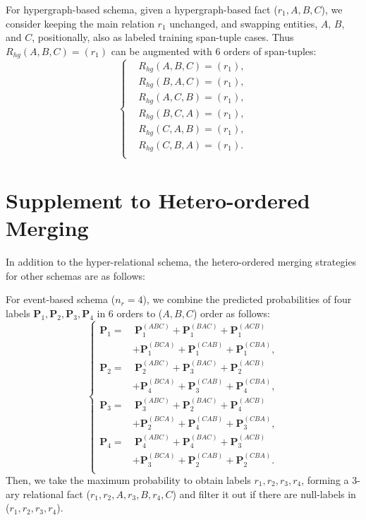 \documentclass{article} \usepackage{iclr2024_conference,times}
\begin{document}
For hypergraph-based schema, given a hypergraph-based fact ($r_1,A,B,C$), we consider keeping the main relation $r_1$ unchanged, and swapping entities, $A$, $B$, and $C$, positionally, also as labeled training span-tuple cases. Thus $R_{hg}(A,B,C)=(r_1)$ can be augmented with 6 orders of span-tuples:
\begin{equation}
\left\{
\begin{aligned}
&R_{hg}(A,B,C)=(r_1),\\
&R_{hg}(B,A,C)=(r_1),\\
&R_{hg}(A,C,B)=(r_1),\\
&R_{hg}(B,C,A)=(r_1),\\
&R_{hg}(C,A,B)=(r_1),\\
&R_{hg}(C,B,A)=(r_1).\\
\end{aligned}
\right.
\end{equation}


\section{Supplement to Hetero-ordered Merging}
\label{AppB}

In addition to the hyper-relational schema, the hetero-ordered merging strategies for other schemas are as follows:

For event-based schema ($n_r=4$), we combine the predicted probabilities of four labels $\mathbf{P}_{1},\mathbf{P}_{2},\mathbf{P}_{3},\mathbf{P}_{4}$ in 6 orders to ($A,B,C$) order as follows:
\begin{equation}
\left\{
\begin{aligned}
\mathbf{P}_{1}=&\ \mathbf{P}_1^{(ABC)}+\mathbf{P}_1^{(BAC)}+\mathbf{P}_1^{(ACB)}\\
&+\mathbf{P}_1^{(BCA)}+\mathbf{P}_1^{(CAB)}+\mathbf{P}_1^{(CBA)},\\
\mathbf{P}_{2}=&\ \mathbf{P}_2^{(ABC)}+\mathbf{P}_3^{(BAC)}+\mathbf{P}_2^{(ACB)}\\
&+\mathbf{P}_4^{(BCA)}+\mathbf{P}_3^{(CAB)}+\mathbf{P}_4^{(CBA)},\\
\mathbf{P}_{3}=&\ \mathbf{P}_3^{(ABC)}+\mathbf{P}_2^{(BAC)}+\mathbf{P}_4^{(ACB)}\\
&+\mathbf{P}_2^{(BCA)}+\mathbf{P}_4^{(CAB)}+\mathbf{P}_3^{(CBA)},\\
\mathbf{P}_{4}=&\ \mathbf{P}_4^{(ABC)}+\mathbf{P}_4^{(BAC)}+\mathbf{P}_3^{(ACB)}\\
&+\mathbf{P}_3^{(BCA)}+\mathbf{P}_2^{(CAB)}+\mathbf{P}_2^{(CBA)}.\\
\end{aligned}
\right.
\end{equation}
Then, we take the maximum probability to obtain labels $r_1,r_2,r_3,r_4$, forming a 3-ary relational fact ($r_1,r_2,A,r_3,B,r_4,C$) and filter it out if there are null-labels in ($r_1,r_2,r_3,r_4$).
\end{document}
